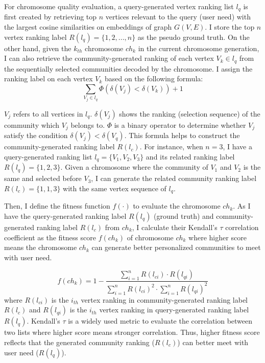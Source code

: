 For chromosome quality evaluation, a query-generated vertex ranking list $l_{q}$ is first created by retrieving top $n$ vertices relevant to the query (user need) with the largest cosine similarities on embeddings of graph $G(V,E)$. I store the top $n$ vertex ranking label $R(l_{q})=\{1,2,...,n\}$ as the pseudo ground truth. On the other hand, given the $k_{th}$ chromosome $ch_k$ in the current chromosome generation, I can also retrieve the community-generated ranking of each vertex $V_{k} \in l_{q}$ from the sequentially selected communities decoded by the chromosome. I assign the ranking label on each vertex $V_{k}$ based on the following formula:
\begin{equation}
\sum_{V_{j} \in l_{q}}\Phi(\delta(V_{j}) < \delta(V_{k})) + 1
\end{equation} 

$V_{j}$ refers to all vertices in $l_{q}$. $\delta(V_{j})$ shows the ranking (selection sequence) of the community which $V_{j}$ belongs to. $\Phi$ is a binary operator to determine whether $V_{j}$ satisfy the condition $\delta(V_{j}) < \delta(V_{q})$. This formula helps to construct the community-generated ranking label $R(l_c)$. For instance, when $n=3$, I have a query-generated ranking list $l_q = \{V_1,V_2,V_3\}$ and its related ranking label $R(l_q) = \{1,2,3\}$. Given a chromosome where the community of $V_1$ and $V_2$ is the same and selected before $V_3$, I can generate the related community ranking label $R(l_c) = \{1,1,3\}$ with the same vertex sequence of $l_q$.

Then, I define the fitness function $f(\cdot)$ to evaluate the chromosome $ch_{k}$. As I have the query-generated ranking label $R(l_{q})$ (ground truth) and community-generated ranking label $R(l_{c})$ from $ch_{k}$, I calculate their Kendall's $\tau$  correlation coefficient  as the fitness score $f(ch_k)$ of chromosome $ch_k$ where higher score means the chromosome $ch_{k}$ can  generate better personalized communities to meet with user need. 

\begin{equation}
\textit{$f(ch_{k})$} = 1-\frac{\sum_{i=1}^{n} R(l_{ci})\cdot R(l_{qi})}{\sum_{i=1}^{n} R(l_{ci})^2\cdot \sum_{i=1}^{n}R(l_{qi})^2}
\end{equation} 
where $R(l_{ci})$ is the $i_{th}$ vertex ranking in community-generated ranking label $R(l_{c})$ and $R(l_{qi})$ is the $i_{th}$ vertex ranking in query-generated ranking label $R(l_{q})$. Kendall's $\tau$ is a widely used metric to evaluate the correlation between two lists where higher score means stronger correlation. Thus, higher fitness score reflects that the generated community ranking ($R(l_{c})$) can better meet with user need ($R(l_{q})$). 

